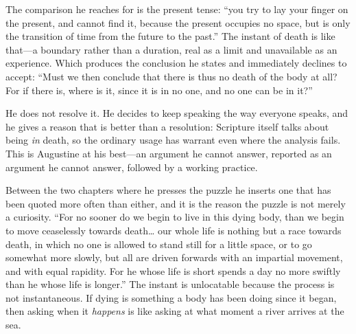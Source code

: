 The comparison he reaches for is the present tense: ``you try to lay your finger on the present, and cannot find it, because the present occupies no space, but is only the transition of time from the future to the past.'' The instant of death is like that---a boundary rather than a duration, real as a limit and unavailable as an experience. Which produces the conclusion he states and immediately declines to accept: ``Must we then conclude that there is thus no death of the body at all? For if there is, where is it, since it is in no one, and no one can be in it?''

He does not resolve it. He decides to keep speaking the way everyone speaks, and he gives a reason that is better than a resolution: Scripture itself talks about being \emph{in} death, so the ordinary usage has warrant even where the analysis fails. This is Augustine at his best---an argument he cannot answer, reported as an argument he cannot answer, followed by a working practice.

Between the two chapters where he presses the puzzle he inserts one that has been quoted more often than either, and it is the reason the puzzle is not merely a curiosity. ``For no sooner do we begin to live in this dying body, than we begin to move ceaselessly towards death\ldots{} our whole life is nothing but a race towards death, in which no one is allowed to stand still for a little space, or to go somewhat more slowly, but all are driven forwards with an impartial movement, and with equal rapidity. For he whose life is short spends a day no more swiftly than he whose life is longer.'' The instant is unlocatable because the process is not instantaneous. If dying is something a body has been doing since it began, then asking when it \emph{happens} is like asking at what moment a river arrives at the sea.

